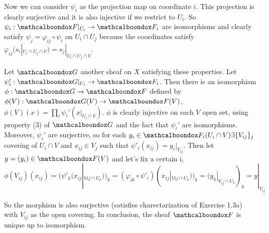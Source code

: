 \begin{sol}
	Now we can consider $\psi_i$ as the projection map on coordinate $i$. This projection is clearly surjective and it is also injective if we restrict to $U_i$. So $\psi_i: \sF|_{U_i} \to \sF_i$ are isomorphisms and clearly satisfy $\psi_j = \varphi_{ij} \circ \psi_i$ on $U_i \cap U_j$ because the coordinates satisfy $\varphi_{ij}(s_i|_{U_i \cap U_j \cap V}) = s_j|_{U_i \cap U_j \cap V}$.

	Let $\sG$ another sheaf on $X$ satisfying these properties. Let $\psi_i': \sG|_{U_i} \to \sF_i$. Then there is an isomorphism $\phi: \sG \to \sF$ defined by $\phi(V): \sG(V) \to \sF(V)$, $\phi(V)(x) = \prod_i \psi_i'(x|_{U_i \cap V})$. $\phi$ is clearly injective on each $V$ open set, using property (3) of $\sG$ and the fact that $\psi_i'$ are isomorphisms. Moreover, $\psi_i'$ are surjective, so for each $y_i \in \sF_i(U_i \cap V) \exists \{V_{ij}\}_j$ covering of $U_i \cap V$ and $x_{ij} \in V_j$ such that $\psi'_i(x_{ij}) = y_i|_{V_{ij}}$. Then let $y = (y_i) \in \sF(V)$ and let's fix a certain i, 
	\[
		\phi(V_{ij})(x_{ij}) = (\psi'_k(x_{ij}|_{V{ij} \cap U_k}))_k = (\varphi_{ik} \circ \psi'_i)(x_{ij}|_{V{ij} \cap U_k}))_k = (y_k|_{V_{ij} \cap U_k})_k = y|_{V_{ij}}
	\]

	So the morphism is also surjective (satisfies charectarization of Exercise 1.3a) with $V_{ij}$ as the open covering. In conclusion, the sheaf $\sF$ is unique up to isomorphism.
\end{sol}